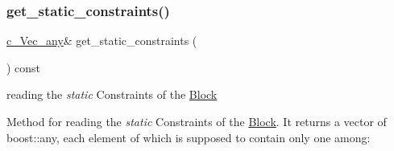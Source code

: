 \subsubsection{\texorpdfstring{get\+\_\+static\+\_\+constraints()}{get\_static\_constraints()}}
{\footnotesize\ttfamily \mbox{\hyperlink{group___s_m_s__types_gaa16aeddc7a50d64299ee0f8d9ca5dc7d}{c\+\_\+\+Vec\+\_\+any}}\& get\+\_\+static\+\_\+constraints (\begin{DoxyParamCaption}\item[{void}]{ }\end{DoxyParamCaption}) const\hspace{0.3cm}{\ttfamily [inline]}}



reading the {\itshape static} Constraints of the \mbox{\hyperlink{class_s_m_spp__di__unipi__it_1_1_block}{Block}} 

Method for reading the {\itshape static} Constraints of the \mbox{\hyperlink{class_s_m_spp__di__unipi__it_1_1_block}{Block}}. It returns a vector of boost\+::any, each element of which is supposed to contain only one among\+:


